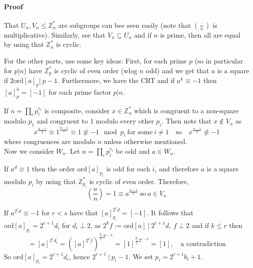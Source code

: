\documentclass{scrartcl}
\newcommand{\Z}{\mathbb{Z}}
\begin{document}
\paragraph{Proof} That $U_n, V_n \leq \Z_n^*$ are subgroups can bee seen easily (note that $(\frac \cdot n )$ is multiplicative). Similarly, see that $V_n \subseteq U_n$ and if $n$ is prime, then all are equal by using that $\Z_n^*$ is cyclic.

For the other parts, use some key ideas: First, for each prime $p$ (so in particular for $p | n$) have $\Z_p^*$ is cyclic of even order (wlog $n$ odd) and we get that $a$ is a square if $2\mathrm{ord}[a]_p | \ p - 1$. Furthermore, we have the CRT and if $a^k \equiv -1$ then $[a]_p^k = [-1]$ for each prime factor $p | n$.

If $n = \prod_i p_i^{e_i}$ is composite, consider $x \in \Z_n^*$ which is congruent to a non-square modulo $p_1$ and congruent to $1$ modulo every other $p_i$. Then note that $x \notin V_n$ as
\begin{equation*}
    x^{\frac {n - 1} 2} \equiv 1^{\frac {n - 1} 2} \equiv 1 \not\equiv -1 \mod p_i \ \text{for some} \ i \neq 1 \quad \text{so} \quad x^{\frac {n - 1} 2} \not\equiv -1
\end{equation*}
where congruences are modulo $n$ unless otherwise mentioned.
\\
Now we consider $W_n$. Let $n = \prod_i p_i^{e_i}$ be odd and $a \in W_n$. 

If $a^d \equiv 1$ then the order $\mathrm{ord}[a]_{p_i}$ is odd for each $i$, and therefore $a$ is a square modulo $p_i$ by using that $\Z_{p_i}^*$ is cyclic of even order. Therefore, 
\begin{equation*}
    \left(\frac a n\right) = 1 \equiv a^{\frac {n - 1} 2} \ \text{so} \ a \in V_n
\end{equation*}

If $a^{2^rd} \equiv -1$ for $r < s$ have that $[a]_{p_i}^{2^rd} = [-1]$. It follows that $\mathrm{ord} [a]_{p_i} = 2^{r + 1}d_i$ for $d_i \perp 2$, as $2^kf := \mathrm{ord}[a] \ | \ 2^{r + 1}d, \ f \perp 2$ and if $k \leq r$ then
\begin{equation*}
    [-1] = [a]^{2^rd_i} = \left([a]^{2^k f}\right)^{\frac {d_i} f 2^{r - k}} = [1]^{\frac {d_i} f 2^{r - k}} = [1], \quad \text{a contradiction}
\end{equation*}
So $\mathrm{ord} [a]_{p_i} = 2^{r + 1}d_i$, hence $2^{r + 1} \ | \ p_i - 1$. We set $p_i = 2^{r + 1} b_i + 1$.
\end{document}

